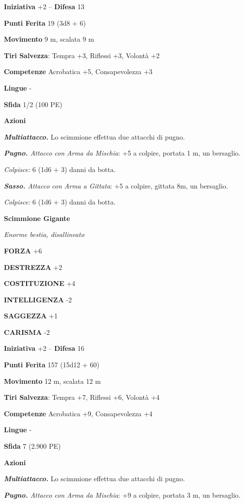 \begin{multicols}{2}
\textbf{Iniziativa} +2 -- \textbf{Difesa} 13

\textbf{Punti Ferita} 19 (3d8 + 6)

\textbf{Movimento} 9 m, scalata 9 m

\textbf{Tiri Salvezza}: Tempra +3, Riflessi +3, Volontà +2

\textbf{Competenze} Acrobatica +5, Consapevolezza +3

\textbf{Lingue} -

\textbf{Sfida} 1/2 (100 PE)

\textbf{Azioni}

\emph{\textbf{Multiattacco.}} Lo scimmione effettua due attacchi di pugno.

\emph{\textbf{Pugno.} Attacco con Arma da Mischia}: +5 a colpire, portata 1 m, un bersaglio.

\emph{Colpisce:} 6 (1d6 + 3) danni da botta.

\emph{\textbf{Sasso.} Attacco con Arma a Gittata}: +5 a colpire, gittata 8m, un bersaglio.

\emph{Colpisce:} 6 (1d6 + 3) danni da botta.

\medskip\textbf{Scimmione Gigante}

\emph{Enorme bestia, disallineato}

\textbf{FORZA} +6

\textbf{DESTREZZA} +2

\textbf{COSTITUZIONE} +4

\textbf{INTELLIGENZA} -2

\textbf{SAGGEZZA} +1

\textbf{CARISMA} -2

\textbf{Iniziativa} +2 -- \textbf{Difesa} 16

\textbf{Punti Ferita} 157 (15d12 + 60)

\textbf{Movimento} 12 m, scalata 12 m

\textbf{Tiri Salvezza}: Tempra +7, Riflessi +6, Volontà +4

\textbf{Competenze} Acrobatica +9, Consapevolezza +4

\textbf{Lingue} -

\textbf{Sfida} 7 (2.900 PE)

\textbf{Azioni}

\emph{\textbf{Multiattacco.}} Lo scimmione effettua due attacchi di pugno.

\emph{\textbf{Pugno.} Attacco con Arma da Mischia}: +9 a colpire, portata 3 m, un bersaglio.


\end{multicols}

